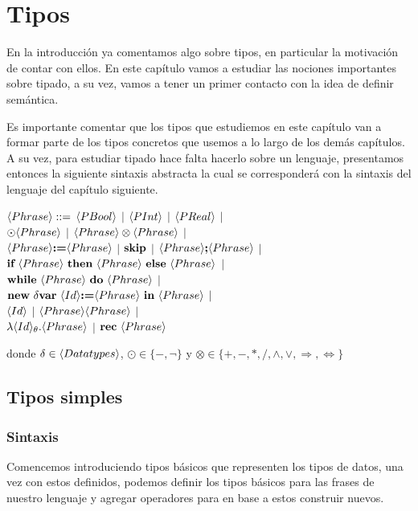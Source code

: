 \chapter{Tipos}
\label{chap:types}

En la introducci\'on ya comentamos algo sobre tipos, en particular la 
motivaci\'on de contar con ellos. En este cap\'itulo vamos a estudiar las 
nociones importantes sobre tipado, a su vez, vamos a tener un primer contacto
con la idea de definir sem\'antica. \

Es importante comentar que los tipos que estudiemos en este cap\'itulo van
a formar parte de los tipos concretos que usemos a lo largo de los dem\'as
cap\'itulos. A su vez, para estudiar tipado hace falta hacerlo sobre un
lenguaje, presentamos entonces la siguiente sintaxis abstracta la cual
se corresponder\'a con la sintaxis del lenguaje del cap\'itulo siguiente.

\begin{center} 

$\langle Phrase \rangle ::=$ $\langle PBool \rangle$ $|$ $\langle PInt \rangle$ $|$ $\langle PReal \rangle$ $|$ \\
$\odot \langle Phrase \rangle$ $|$ $\langle Phrase \rangle \otimes \langle Phrase \rangle $ $|$ \\
$\langle Phrase \rangle \textbf{:=} \langle Phrase \rangle$ $|$ $\textbf{skip}$ $|$ $\langle Phrase \rangle \textbf{;} \langle Phrase \rangle$ $|$ \\

$\textbf{if} \ \langle Phrase \rangle \ \textbf{then} \ \langle Phrase \rangle \ \textbf{else} \ \langle Phrase \rangle$ $|$\\

$\textbf{while} \ \langle Phrase \rangle \ \textbf{do} \ \langle Phrase \rangle$ $|$ \\
$\textbf{new} \ \delta \textbf{var} \ \langle Id \rangle \textbf{:=} \langle Phrase \rangle \ \textbf{in} \ \langle Phrase \rangle$ $|$\\
$\langle Id \rangle$ $|$ $\langle Phrase \rangle\langle Phrase \rangle$ $|$\\
$\lambda \langle Id \rangle_{\theta} . \langle Phrase \rangle $ $|$ 
$\textbf{rec} \ \langle Phrase \rangle$

\end{center}

donde $\delta \in \langle Data types \rangle$, $\odot \in \{-, \neg\}$ y 
$\otimes \in \{+,-,*,/,\wedge,\vee,\Rightarrow,\Leftrightarrow\}$

\section{Tipos simples}

\subsection{Sintaxis}
Comencemos introduciendo tipos b\'asicos que representen los tipos de datos,
una vez con estos definidos, podemos definir los tipos b\'asicos para las
frases de nuestro lenguaje y agregar operadores para en base a estos
construir nuevos.\

